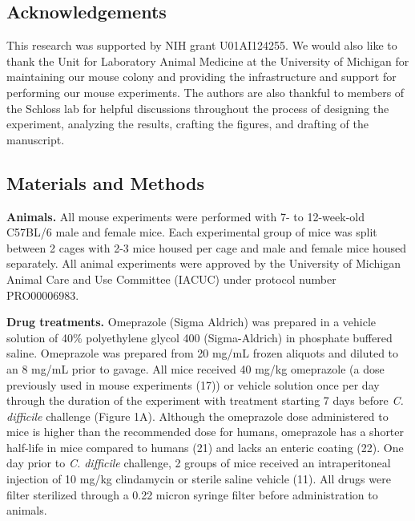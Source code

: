 \documentclass[11pt,]{article}
\begin{document}
\subsection{Acknowledgements}\label{acknowledgements}

This research was supported by NIH grant U01AI124255. We would also like
to thank the Unit for Laboratory Animal Medicine at the University of
Michigan for maintaining our mouse colony and providing the
infrastructure and support for performing our mouse experiments. The
authors are also thankful to members of the Schloss lab for helpful
discussions throughout the process of designing the experiment,
analyzing the results, crafting the figures, and drafting of the
manuscript.

\newpage

\subsection{Materials and Methods}\label{materials-and-methods}

\textbf{Animals.} All mouse experiments were performed with 7- to
12-week-old C57BL/6 male and female mice. Each experimental group of
mice was split between 2 cages with 2-3 mice housed per cage and male
and female mice housed separately. All animal experiments were approved
by the University of Michigan Animal Care and Use Committee (IACUC)
under protocol number PRO00006983.

\textbf{Drug treatments.} Omeprazole (Sigma Aldrich) was prepared in a
vehicle solution of 40\% polyethylene glycol 400 (Sigma-Aldrich) in
phosphate buffered saline. Omeprazole was prepared from 20 mg/mL frozen
aliquots and diluted to an 8 mg/mL prior to gavage. All mice received 40
mg/kg omeprazole (a dose previously used in mouse experiments (17)) or
vehicle solution once per day through the duration of the experiment
with treatment starting 7 days before \emph{C. difficile} challenge
(Figure 1A). Although the omeprazole dose administered to mice is higher
than the recommended dose for humans, omeprazole has a shorter half-life
in mice compared to humans (21) and lacks an enteric coating (22). One
day prior to \emph{C. difficile} challenge, 2 groups of mice received an
intraperitoneal injection of 10 mg/kg clindamycin or sterile saline
vehicle (11). All drugs were filter sterilized through a 0.22 micron
syringe filter before administration to animals.
\end{document}

